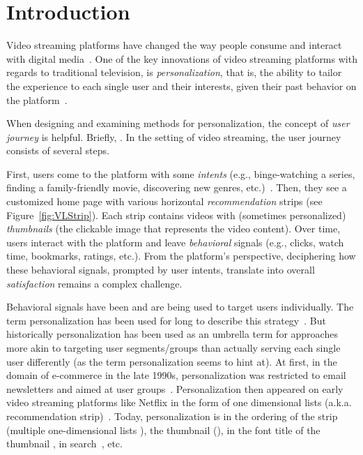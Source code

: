 
\chapter{Introduction}
\label{chapter:introduction}


Video streaming platforms have changed the way people consume and interact with digital media~\cite{NetflixReco}. 
One of the key innovations of video streaming platforms with regards to traditional television, is \emph{personalization}, that is, the ability to tailor the experience to each single user and their interests, given their past behavior on the platform~\cite{oldPersonalizationBehavior, oldPersonalizationSearch}. 

When designing and examining methods for personalization, the concept of \emph{user journey} is helpful. 
Briefly, .
In the setting of video streaming, the user journey consists of several steps.

First, users come to the platform with some \emph{intents} (e.g., binge-watching a series, finding a family-friendly movie, discovering new genres, etc.)~\cite{intent}. Then, they see a customized home page with various horizontal \emph{recommendation} strips (see Figure~\ref{fig:VLStrip}). Each strip contains videos with (sometimes personalized) \emph{thumbnails} (the clickable image that represents the video content). Over time, users interact with the platform and leave \emph{behavioral} signals (e.g., clicks, watch time, bookmarks, ratings, etc.). From the platform's perspective, deciphering how these behavioral signals, prompted by user intents, translate into overall \emph{satisfaction} remains a complex challenge.

Behavioral signals have been and are being used to target users individually. 
The term personalization has been used for long to describe this strategy~\cite{oldPersonalizationBehavior, oldPersonalizationSearch}. 
But historically personalization has been used as an umbrella term for approaches more akin to targeting user segments/groups than actually serving each single user differently (as the term personalization seems to hint at). 
At first, in the domain of e-commerce in the late 1990s, personalization was restricted to email newsletters and aimed at user groups~\cite{oldReco}. 
Personalization then appeared on early video streaming platforms like Netflix in the form of one dimensional lists (a.k.a. recommendation strip)~\cite{oldReco}. 
Today, personalization is in the ordering of the strip (multiple one-dimensional lists \todo{[REF]}), the thumbnail (\todo{[REF]}), in the font title of the thumbnail \todo{+ [REF]}, in search~\cite{NetflixReco}, etc.

